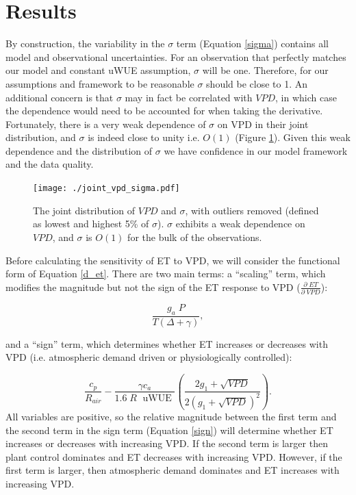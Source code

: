 \documentclass[draft,linenumbers]{agujournal}
\begin{document}
\section{Results}
\label{results}

By construction, the variability in the $\sigma$ term (Equation
\ref{sigma}) contains all model and observational uncertainties. For
an observation that perfectly matches our model and constant uWUE
assumption, $\sigma$ will be one. Therefore, for our assumptions and
framework to be reasonable $\sigma$ should be close to 1. An
additional concern is that $\sigma$ may in fact be correlated with
$VPD$, in which case the dependence would need to be accounted for
when taking the derivative. Fortunately, there is a very weak
dependence of $\sigma$ on VPD in their joint distribution, and
$\sigma$ is indeed close to unity i.e. $O(1)$ (Figure
\ref{joint_vpd_sigma}). Given this weak dependence and the
distribution of $\sigma$ we have confidence in our model framework and
the data quality.

\begin{figure}
  \centering \texttt{[image: ./joint\_vpd\_sigma.pdf]}
  \caption{The joint distribution of $VPD$ and $\sigma$, with outliers
    removed (defined as lowest and highest 5\% of $\sigma$). $\sigma$
    exhibits a weak dependence on $VPD$, and $\sigma$ is $O(1)$ for
    the bulk of the observations.}
  \label{joint_vpd_sigma}
\end{figure}

Before calculating the sensitivity of ET to VPD, we will consider the
functional form of Equation \ref{d_et}. There are two main terms: a
``scaling'' term, which modifies the magnitude but not the sign of the
ET response to VPD ($\frac{\partial \; ET}{\partial \; VPD}$):

\begin{equation}
  \frac{g_a \; P}{T(\Delta + \gamma)},
\end{equation}

and a ``sign'' term, which determines whether ET increases or
decreases with VPD (i.e. atmospheric demand driven or physiologically
controlled):

\begin{equation}
  \label{sign}
  \frac{c_p}{R_{air}} - \frac{\gamma c_a }{1.6 \; R\; \text{ uWUE }} \left( \frac{2 g_1 + \sqrt{VPD}}{2 (g_1 + \sqrt{VPD})^2}\right).
\end{equation}
All variables are positive, so the relative magnitude between the
first term and the second term in the sign term (Equation \ref{sign})
will determine whether ET increases or decreases with increasing
VPD. If the second term is larger then plant control dominates and ET
decreases with increasing VPD. However, if the first term is larger,
then atmospheric demand dominates and ET increases with increasing
VPD.
\end{document}
